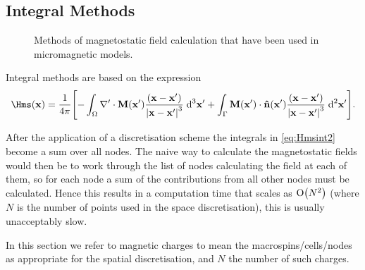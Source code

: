 \subsection{Integral Methods}
\label{sec:magstat-field-calc-inte}

\begin{figure}
  \centering
  \caption{Methods of magnetostatic field calculation that have been used in micromagnetic models.}
  \label{fig:types-mag-stat}
\end{figure}

Integral methods are based on the expression
\begin{equation}
  \Hms(\xv) = \frac{1}{4 \pi} \bigs{ 
    - \int_\magd \nabla' \cdot \Mv(\xv') \frac{(\xv - \xv')}{\abs{\xv -\xv'}^3} \d^3 \xv'
    + \int_\boundd \Mv(\xv') \cdot \nv(\xv') \frac{(\xv - \xv')}{\abs{\xv - \xv'}^3} \d^2 \xv' }.
  \label{eq:Hmsint2}
\end{equation}

After the application of a discretisation scheme the integrals in \cref{eq:Hmsint2} become a sum over all nodes.
The naive way to calculate the magnetostatic fields would then be to work through the list of nodes calculating the field at each of them, so for each node a sum of the contributions from all other nodes must be calculated.
Hence this results in a computation time that scales as $\text{O}{\left( N^2 \right)}$ (where $N$ is the number of points used in the space discretisation), this is usually unacceptably slow.

In this section we refer to magnetic charges to mean the macrospins/cells/nodes as appropriate for the spatial discretisation, and $N$ the number of such charges.


